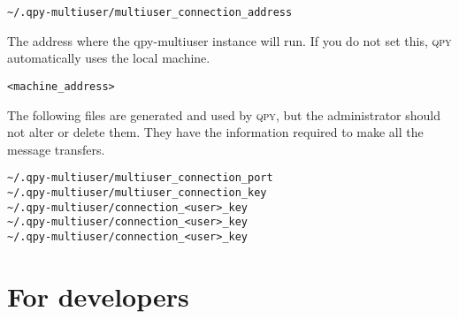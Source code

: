\documentclass[a4paper,12pt]{article}
\newcommand{\qpy}{\textsc{qpy}}
\begin{document}
\begin{verbatim}
~/.qpy-multiuser/multiuser_connection_address
\end{verbatim}

The address where the qpy-multiuser instance will run.
If you do not set this, \qpy{} automatically uses the local machine.

\begin{lstlisting}[style=FileStyle]
<machine_address>
\end{lstlisting}


The following files are generated and used by \qpy{}, but the administrator should not alter or delete them.
They have the information required to make all the message transfers.

\begin{verbatim}
~/.qpy-multiuser/multiuser_connection_port
~/.qpy-multiuser/multiuser_connection_key
~/.qpy-multiuser/connection_<user>_key
~/.qpy-multiuser/connection_<user>_key
~/.qpy-multiuser/connection_<user>_key
\end{verbatim}









\newpage
\section{For developers}





\linespread{0.8}
\end{document}
